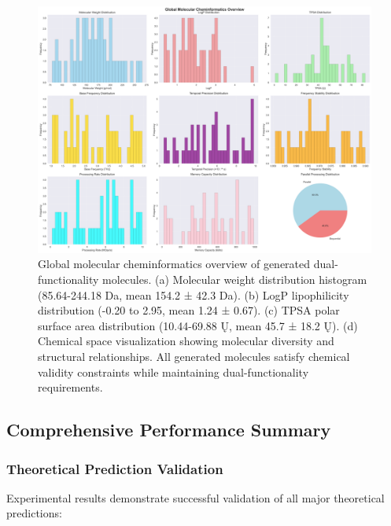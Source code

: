 \documentclass[12pt,a4paper]{article}
\begin{document}
\begin{figure}[H]
    \centering
    \includegraphics[width=1.0\textwidth]{images/molecular_global_overview.png}
    \caption{Global molecular cheminformatics overview of generated dual-functionality molecules. (a) Molecular weight distribution histogram (85.64-244.18 Da, mean 154.2 ± 42.3 Da). (b) LogP lipophilicity distribution (-0.20 to 2.95, mean 1.24 ± 0.67). (c) TPSA polar surface area distribution (10.44-69.88 Ų, mean 45.7 ± 18.2 Ų). (d) Chemical space visualization showing molecular diversity and structural relationships. All generated molecules satisfy chemical validity constraints while maintaining dual-functionality requirements.}
    \label{fig:molecular_overview}
\end{figure}


\subsection{Comprehensive Performance Summary}

\subsubsection{Theoretical Prediction Validation}

Experimental results demonstrate successful validation of all major theoretical predictions:
\end{document}
